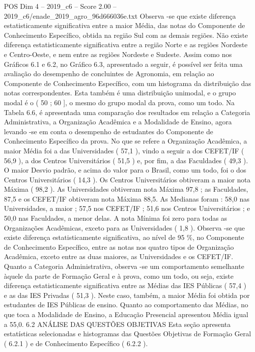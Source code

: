 \begin{textsample}{POS Dim 4 – 2019\_c6 – Score 2.00 – 2019\_c6/enade\_2019\_agro\_96d666036e.txt}
Observa -se que existe diferença estatisticamente significativa entre a maior Média, das notas do Componente de Conhecimento Específico, obtida na região Sul com as demais regiões.
Não existe diferença estatisticamente significativa entre a região Norte e as regiões Nordeste e Centro-Oeste, e nem entre as regiões Nordeste e Sudeste.
Assim como nos Gráficos 6.1 e 6.2, no Gráfico 6.3, apresentado a seguir, é possível ser feita uma avaliação do desempenho de concluintes de Agronomia, em relação ao Componente de Conhecimento Específico, com um histograma da distribuição das notas correspondentes.
Esta também é uma distribuição unimodal, e o grupo modal é o ( 50 ; 60 ], o mesmo do grupo modal da prova, como um todo.
Na Tabela 6.6, é apresentada uma comparação dos resultados em relação a Categoria Administrativa, a Organização Acadêmica e a Modalidade de Ensino, agora levando -se em conta o desempenho de estudantes do Componente de Conhecimento Específico da prova.
No que se refere a Organização Acadêmica, a maior Média foi a das Universidades ( 57,1 ), vindo a seguir a dos CEFET/IF ( 56,9 ), a dos Centros Universitários ( 51,5 ) e, por fim, a das Faculdades ( 49,3 ).
O maior Desvio padrão, e acima do valor para o Brasil, como um todo, foi o dos Centros Universitários ( 14,3 ).
Os Centros Universitários obtiveram a maior nota Máxima ( 98,2 ).
As Universidades obtiveram nota Máxima 97,8 ; as Faculdades, 87,5 e os CEFET/IF obtiveram nota Máxima 88,5.
As Medianas foram : 58,0 nas Universidades, a maior ; 57,5 nos CEFET/IF ; 51,6 nos Centros Universitários ; e 50,0 nas Faculdades, a menor delas.
A nota Mínima foi zero para todas as Organizações Acadêmicas, exceto para as Universidades ( 1,8 ).
Observa -se que existe diferença estatisticamente significativa, ao nível de 95 \%, no Componente de Conhecimento Específico, entre as notas nos quatro tipos de Organização Acadêmica, exceto entre as duas maiores, as Universidades e os CEFET/IF.
Quanto a Categoria Administrativa, observa -se um comportamento semelhante àquele da parte de Formação Geral e à prova, como um todo, ou seja, existe diferença estatisticamente significativa entre as Médias das IES Públicas ( 57,4 ) e as das IES Privadas ( 51,3 ).
Neste caso, também, a maior Média foi obtida por estudantes de IES Públicas de ensino.
Quanto ao comportamento das Médias, no que toca a Modalidade de Ensino, a Educação Presencial apresentou Média igual a 55,0. 6.2 ANÁLISE DAS QUESTÕES OBJETIVAS Esta seção apresenta estatísticas selecionadas e histogramas das Questões Objetivas de Formação Geral ( 6.2.1 ) e de Conhecimento Específico ( 6.2.2 ).

\end{textsample}
